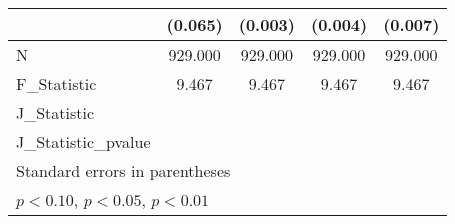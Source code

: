 {\begin{tabular}{l*{4}{c}}
            &     (0.065)         &     (0.003)         &     (0.004)         &     (0.007)         \\
\hline
N           &     929.000         &     929.000         &     929.000         &     929.000         \\
F\_Statistic &       9.467         &       9.467         &       9.467         &       9.467         \\
J\_Statistic &                     &                     &                     &                     \\
J\_Statistic\_pvalue&                     &                     &                     &                     \\
\hline\hline
\multicolumn{5}{l}{\footnotesize Standard errors in parentheses}\\
\multicolumn{5}{l}{\footnotesize \sym{*} \(p<0.10\), \sym{**} \(p<0.05\), \sym{***} \(p<0.01\)}\\
\end{tabular}
}
